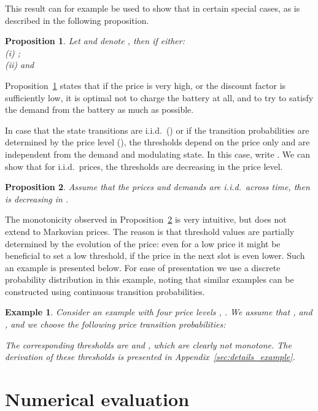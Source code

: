 \documentclass[journal]{IEEEtran}
\newcommand\1{\mathbf{1}}
\newtheorem{proposition}{Proposition}
\newtheorem{example}{Example}
\begin{document}
This result can for example be used to show that  in certain special cases, as is described in the following proposition.

\begin{proposition}\label{pro:max_price}
Let  and denote , then  if either:\\
(i) ;\\
(ii)  and 
\end{proposition}

Proposition~\ref{pro:max_price} states that if the price is very high, or the discount factor is sufficiently low, it is optimal not to charge the battery at all, and to try to satisfy the demand from the battery as much as possible.

In case that the state transitions are i.i.d.\ () or if the transition probabilities are determined by the price level (), the thresholds  depend on the price only and are independent from the demand and modulating state. In this case, write . We can show that for i.i.d.\ prices, the thresholds are decreasing in the price level.
\begin{proposition}\label{pro:monotone_thresholds}
Assume that the prices and demands are i.i.d.\ across time, then  is decreasing in .
\end{proposition}

The monotonicity observed in Proposition~\ref{pro:monotone_thresholds} is very intuitive, but does not extend to Markovian prices. The reason is that threshold values are partially determined by the evolution of the price: even for a low price it might be beneficial to set a low threshold, if the price in the next slot is even lower. Such an example is presented below. For ease of presentation we use a discrete probability distribution  in this example, noting that similar examples can be constructed using continuous transition probabilities.
\begin{example}\label{exa:example}
Consider an example with four price levels , . We assume that ,  and , and we choose the following price transition probabilities:

The corresponding thresholds are  and , which are clearly not monotone. The derivation of these thresholds is presented in Appendix~\ref{sec:details_example}.
\end{example}



\section{Numerical evaluation}\label{sec:example}
\end{document}
